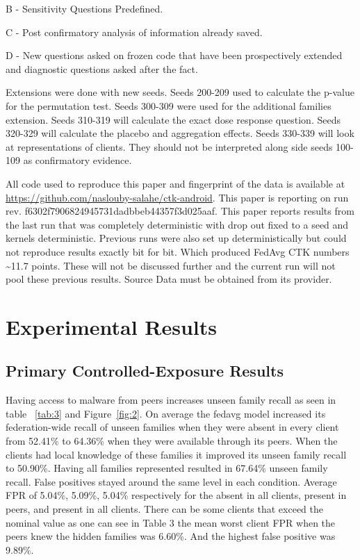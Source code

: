 \documentclass[12pt,letterpaper]{article}
\begin{document}
B - Sensitivity Questions Predefined. 

C - Post confirmatory analysis of information already saved.

D - New questions asked on frozen code that have been prospectively extended and diagnostic questions asked after the fact.

Extensions were done with new seeds. Seeds 200-209 used to calculate the p-value for the permutation test. Seeds 300-309 were used for the additional families extension. Seeds 310-319 will calculate the exact dose response question. Seeds 320-329 will calculate the placebo and aggregation effects. Seeds 330-339 will look at representations of clients. They should not be interpreted along side seeds 100-109 as confirmatory evidence.

All code used to reproduce this paper and fingerprint of the data is available at \url{https://github.com/naslouby-salahe/ctk-android}. This paper is reporting on run rev. f6302f7906824945731dadbbeb44357f3d025aaf. This paper reports results from the last run that was completely deterministic with drop out fixed to a seed and kernels deterministic. Previous runs were also set up deterministically but could not reproduce results exactly bit for bit. Which produced FedAvg CTK numbers \textasciitilde{}11.7 points. These will not be discussed further and the current run will not pool these previous results. Source Data must be obtained from its provider.

\section*{Experimental Results} 

\subsection*{Primary Controlled-Exposure Results} 

Having access to malware from peers increases unseen family recall as seen in table ~\ref{tab:3} and Figure~\ref{fig:2}. On average the fedavg model increased its federation-wide recall of unseen families when they were absent in every client from 52.41\% to 64.36\% when they were available through its peers. When the clients had local knowledge of these families it improved its unseen family recall to 50.90\%. Having all families represented resulted in 67.64\% unseen family recall. False positives stayed around the same level in each condition. Average FPR of 5.04\%, 5.09\%, 5.04\% respectively for the absent in all clients, present in peers, and present in all clients. There can be some clients that exceed the nominal value as one can see in Table 3 the mean worst client FPR when the peers knew the hidden families was 6.60\%. And the highest false positive was 9.89\%. 
\end{document}
